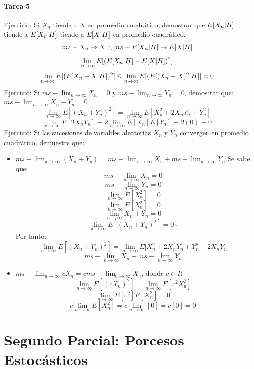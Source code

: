 \documentclass[11pt,fleqn]{book} %
\numberwithin{equation}{section} %
\numberwithin{figure}{section} %
\numberwithin{table}{section} %
\begin{document}
\subsubsection{Tarea 5}
Ejercicio: Si $X_{n}$ tiende a $X$ en promedio cuadrático, demostrar que $E[X_{n} \arrowvert H]$ tiende a $E[X_{n} \arrowvert H]$ tiende a $E[X \arrowvert H]$ en promedio cuadrático.
$$ms-X_{n} \to X \therefore ms-E[X_{n} \arrowvert H] \to E[X \arrowvert H] $$
$$ \lim_{n \to \infty} E[(E[X_{n} \arrowvert H] - E[X \arrowvert H] )^{2}] $$
$$ \lim_{n \to \infty} E[(E[X_{n} - X \arrowvert H] )^{2}] \leq \lim_{n \to \infty} E[(E[(X_{n} - X)^{2} \arrowvert H] ] = 0    $$
Ejercicio: Si $ms- \lim_{n \to \infty} X_{n} = 0$ y $ms- \lim_{n \to \infty} Y_{n} = 0$, demostrar que: $ms- \lim_{n \to \infty} X_{n} - Y_{n} = 0$
$$ \lim_{n \to \infty} E[(X_{n} + Y_{n})^{2}]  = \lim_{n \to \infty} E[X_{n}^{2} + 2X_{n}Y_{n} + Y_{n}^{2} ] $$
$$ \lim_{n \to \infty} E[2X_{n}Y_{n}]  = 2\lim_{n \to \infty} E[X_{n}]E[Y_{n}] = 2(0) = 0$$
Ejercicio: Si las sucesiones de variables aleatorias $X_{n}$ y $Y_{n}$ convergen en promedio cuadrático, demuestre que:
\begin{itemize}
    \item $ms- \lim_{n \to \infty} (X_{n} + Y_{n}) = ms- \lim_{n \to \infty} X_{n} + ms- \lim_{n \to \infty} Y_{n} $
    Se sabe que:
    $$ ms- \lim_{n \to \infty} X_{n} = 0     $$
    $$ ms- \lim_{n \to \infty} Y_{n} = 0     $$
    $$ \lim_{n \to \infty} E[X_{n}^{2}] = 0  $$
    $$ \lim_{n \to \infty} E[X_{n}^{2}] = 0  $$
    $$ \lim_{n \to \infty} X_{n} + Y_{n} = 0 $$
    $$ \lim_{n \to \infty} E[(X_{n} + Y_{n})^{2}] = 0  \therefore $$
    Por tanto:
    $$ \lim_{n \to \infty} E[(X_{n} + Y_{n})^{2}]  = \lim_{n \to \infty} E[X_{n}^{2} + 2X_{n}Y_{n} + Y_{n}^{2} - 2X_{n}Y_{n} $$
    $$ ms- \lim_{n \to \infty} X_{n} + ms- \lim_{n \to \infty} Y_{n} $$
    \item $ms- \lim_{n \to \infty} c X_{n} = c ms- \lim_{n \to \infty} X_{n}$, donde $c \in R$
    $$ \lim_{n \to \infty} E[(cX_{n})^{2}] = \lim_{n \to \infty} E[c^{2}X_{n}^{2}]       $$
    $$ \lim_{n \to \infty} E[c^2] E[X_{n}^{2}] = 0      $$
    $$ c \lim_{n \to \infty} E[X_{n}^{2}] = c \lim_{n \to \infty}[0] = c[0] = 0      $$
\end{itemize}
\chapter{Segundo Parcial: Porcesos Estocásticos}
\end{document}
